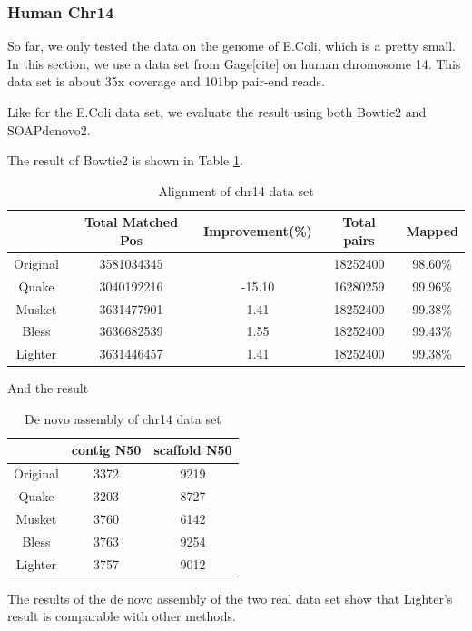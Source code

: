 \documentclass[10pt]{article}
\begin{document}
\subsubsection*{Human Chr14}
So far, we only tested the data on the genome of E.Coli, which is a pretty small. In this section, we use a data set from Gage[cite] on human chromosome 14. This data set is about 35x coverage and 101bp pair-end reads.

Like for the E.Coli data set, we evaluate the result using both Bowtie2 and SOAPdenovo2.

The result of Bowtie2 is shown in Table \ref{table:chr14_bowtie2}.

\begin{table}
\begin{tabular}{|c|c|c|c|c|}\hline
  & Total Matched Pos & Improvement(\%) & Total pairs & Mapped \\ \hline
Original &	3581034345	&	& 18252400 & 98.60\% \\ \hline
Quake	& 3040192216	& -15.10 &	16280259 &	99.96\% \\ \hline
Musket	& 3631477901	& 1.41	& 18252400	& 99.38\% \\ \hline
Bless	& 3636682539	& 1.55	& 18252400	& 99.43\% \\ \hline
Lighter	& 3631446457	& 1.41	& 18252400	& 99.38\% \\ \hline
\end{tabular}
\caption{Alignment of chr14 data set\label{table:chr14_bowtie2}}
\end{table}

And the result 

\begin{table}
\begin{tabular}{|c|c|c|} \hline
		& contig N50	& scaffold N50 \\ \hline
Original	& 3372	& 9219 \\ \hline
Quake	& 3203	& 8727 \\ \hline
Musket	& 3760	& 6142 \\ \hline
Bless	& 3763	& 9254 \\ \hline
Lighter	&  3757	& 9012 \\ \hline
\end{tabular}
\caption{De novo assembly of chr14 data set\label{table:chr14}}
\end{table}

The results of the de novo assembly of the two real data set show that Lighter's result is comparable with other methods.
\end{document}
